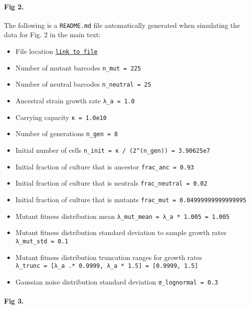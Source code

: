 \documentclass[
]{scrartcl}
\let\oldparagraph\paragraph
\renewcommand{\paragraph}[1]{\oldparagraph{#1}\mbox{}}
\providecommand{\tightlist}{%
  \setlength{\itemsep}{0pt}\setlength{\parskip}{0pt}}\usepackage{longtable,booktabs,array}
\begin{document}
\begin{refsegment}
\hypertarget{fig-2.}{%
\paragraph{Fig 2.}\label{fig-2.}}

The following is a \texttt{README.md} file automatically generated when
simulating the data for Fig. 2 in the main text:

\begin{itemize}
\tightlist
\item
  File location
  \href{https://github.com/mrazomej/bayesian_fitness/blob/master/code/processing/data001_logistic_250bc_01env_01rep/sim_data001.jl}{\texttt{link\ to\ file}}
\item
  Number of mutant barcodes \texttt{n\_mut\ =\ 225}
\item
  Number of neutral barcodes \texttt{n\_neutral\ =\ 25}
\item
  Ancestral strain growth rate \texttt{λ\_a\ =\ 1.0}
\item
  Carrying capacity \texttt{κ\ =\ 1.0e10}
\item
  Number of generations \texttt{n\_gen\ =\ 8}
\item
  Initial number of cells
  \texttt{n\_init\ =\ κ\ /\ (2\^{}(n\_gen))\ =\ 3.90625e7}
\item
  Initial fraction of culture that is ancestor
  \texttt{frac\_anc\ =\ 0.93}
\item
  Initial fraction of culture that is neutrals
  \texttt{frac\_neutral\ =\ 0.02}
\item
  Initial fraction of culture that is mutants
  \texttt{frac\_mut\ =\ 0.04999999999999995}
\item
  Mutant fitness distribution mean
  \texttt{λ\_mut\_mean\ =\ λ\_a\ *\ 1.005\ =\ 1.005}
\item
  Mutant fitness distribution standard deviation to sample growth rates
  \texttt{λ\_mut\_std\ =\ 0.1}
\item
  Mutant fitness distribution truncation ranges for growth rates
  \texttt{λ\_trunc\ =\ {[}λ\_a\ .*\ 0.9999,\ λ\_a\ *\ 1.5{]}\ =\ {[}0.9999,\ 1.5{]}}
\item
  Gaussian noise distribution standard deviation
  \texttt{σ\_lognormal\ =\ 0.3}
\end{itemize}

\hypertarget{fig-3.}{%
\paragraph{Fig 3.}\label{fig-3.}}


\end{refsegment}
\end{document}
